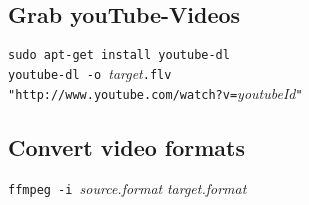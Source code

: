 \subsection{Grab youTube-Videos}
\verb!sudo apt-get install youtube-dl!\\
\verb!youtube-dl -o !\textit{target}\verb!.flv !\\
\verb!"http://www.youtube.com/watch?v=!\textit{youtubeId}\verb!"!

\subsection{Convert video formats}
\verb!ffmpeg -i !\textit{source.format} \textit{target.format}

